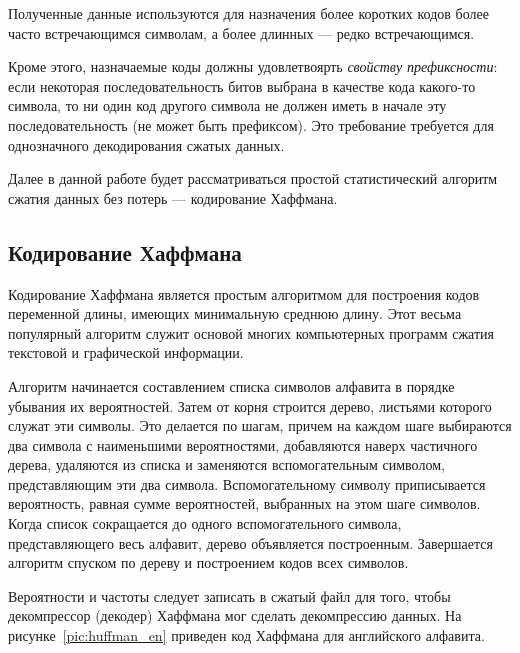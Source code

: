 Полученные данные используются для назначения более коротких кодов 
более часто встречающимся символам, а более длинных --- редко встречающимся.

Кроме этого, назначаемые коды должны удовлетвоярть \textit{свойству префиксности}:
если некоторая последовательность битов выбрана в качестве кода
какого-то символа, то ни один код другого символа не должен иметь
в начале эту последовательность (не может быть префиксом).
Это требование требуется для однозначного декодирования сжатых данных.

Далее в данной работе будет рассматриваться простой статистический
алгоритм сжатия данных без потерь --- кодирование Хаффмана.

\subsection{Кодирование Хаффмана}

Кодирование Хаффмана является простым алгоритмом для построения
кодов переменной длины, имеющих минимальную среднюю длину.
Этот весьма популярный алгоритм служит основой многих компьютерных программ
сжатия текстовой и графической информации.

Алгоритм начинается составлением списка символов алфавита в
порядке убывания их вероятностей. Затем от корня строится дерево,
листьями которого служат эти символы. Это делается по шагам,
причем на каждом шаге выбираются два символа с наименьшими
вероятностями, добавляются наверх частичного дерева, удаляются
из списка и заменяются вспомогательным символом, представляющим
эти два символа. Вспомогательному символу приписывается
вероятность, равная сумме вероятностей, выбранных на этом 
шаге символов. Когда список сокращается до одного вспомогательного символа,
представляющего весь алфавит, дерево объявляется
построенным.
Завершается алгоритм спуском по дереву и построением кодов всех символов.

Вероятности и частоты следует записать в сжатый файл для того,
чтобы декомпрессор (декодер) Хаффмана мог сделать декомпрессию данных.
На рисунке~\ref{pic:huffman_en} приведен код Хаффмана для английского алфавита.

